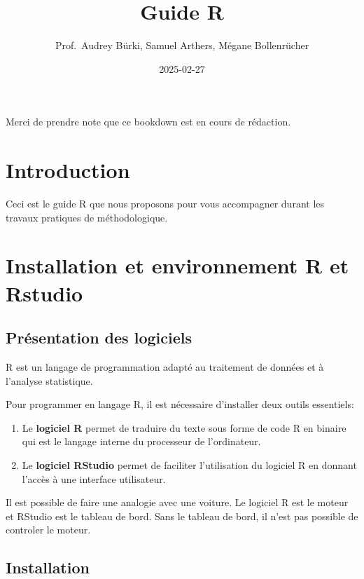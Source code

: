 \documentclass[
]{book}
\title{Guide R}
\author{Prof.~Audrey Bürki, Samuel Arthers, Mégane Bollenrücher}
\date{2025-02-27}
\providecommand{\tightlist}{%
  \setlength{\itemsep}{0pt}\setlength{\parskip}{0pt}}
\begin{document}
\maketitle

{
\setcounter{tocdepth}{1}
\tableofcontents
}
Merci de prendre note que ce bookdown est en cours de rédaction.

\chapter{Introduction}\label{introduction}

Ceci est le guide R que nous proposons pour vous accompagner durant les travaux pratiques de méthodologique.

\chapter{Installation et environnement R et Rstudio}\label{installation-et-environnement-r-et-rstudio}

\section{Présentation des logiciels}\label{pruxe9sentation-des-logiciels}

R est un langage de programmation adapté au traitement de données et à l'analyse statistique.

Pour programmer en langage R, il est nécessaire d'installer deux outils essentiels:

\begin{enumerate}
\def\labelenumi{\arabic{enumi}.}
\tightlist
\item
  Le \textbf{logiciel R} permet de traduire du texte sous forme de code R en binaire qui est le langage interne du processeur de l'ordinateur.
\item
  Le \textbf{logiciel RStudio} permet de faciliter l'utilisation du logiciel R en donnant l'accès à une interface utilisateur.
\end{enumerate}

Il est possible de faire une analogie avec une voiture. Le logiciel R est le moteur et RStudio est le tableau de bord. Sans le tableau de bord, il n'est pas possible de controler le moteur.

\section{Installation}\label{installation}
\end{document}
